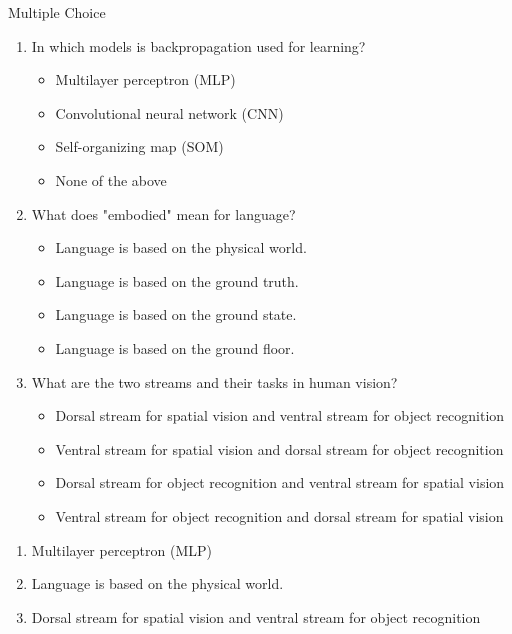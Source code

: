 \documentclass{article}
\begin{document}
\begin{exercise}{Multiple Choice}
  \begin{enumerate}
    \item In which models is backpropagation used for learning?
      \begin{itemize}
        \item Multilayer perceptron (MLP)
        \item Convolutional neural network (CNN)
        \item Self-organizing map (SOM)
        \item None of the above
      \end{itemize}

    \item What does "embodied" mean for language?
      \begin{itemize}
        \item Language is based on the physical world.
        \item Language is based on the ground truth.
        \item Language is based on the ground state.
        \item Language is based on the ground floor.
      \end{itemize}

    \item What are the two streams and their tasks in human vision?
      \begin{itemize}
        \item Dorsal stream for spatial vision and ventral stream for object recognition
        \item Ventral stream for spatial vision and dorsal stream for object recognition
        \item Dorsal stream for object recognition and ventral stream for spatial vision
        \item Ventral stream for object recognition and dorsal stream for spatial vision
      \end{itemize}
  \end{enumerate}

  \begin{solution}
    \begin{enumerate}
      \item Multilayer perceptron (MLP)
      \item Language is based on the physical world.
      \item Dorsal stream for spatial vision and ventral stream for object recognition
    \end{enumerate}
  \end{solution}
\end{exercise}
\end{document}
